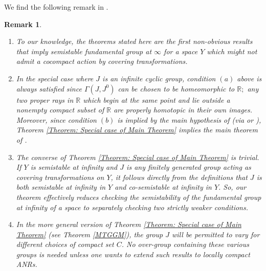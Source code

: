 \documentclass[12pt]{article}
\newtheorem{remark}[theorem]{Remark}
\begin{document}
We find the following remark in \cite{GGM1}.

\begin{remark} \label{Remark in Intro}
\hspace{.25in}
\begin{enumerate}

\item  To our knowledge, the theorems
stated here are the first non-obvious results that imply semistable
fundamental group at $\infty$ for a space $Y$ which might not admit a
cocompact action by covering transformations.

\item \label{Intro remark 2}In the special case where $J$ is an infinite
cyclic group, condition $(a)$ above is always satisfied since $\Gamma\left(
J,J^{0}\right)  $ can be chosen to be homeomorphic to $%
\mathbb{R};
$ any two proper rays in $%
\mathbb{R}
$ which begin at the same point and lie outside a nonempty compact subset of $%
\mathbb{R}
$ are properly homotopic in their own images. Moreover, since condition
$\left(  b\right)  $ is implied by the main hypothesis of \cite{GG12} (via
\cite[Lemma 3.1]{W92} or \cite[Th.16.3.4]{G}), Theorem
\ref{Theorem: Special case of Main Theorem} implies the main theorem of
\cite{GG12} .

\item The converse of Theorem \ref{Theorem: Special case of Main Theorem} is
trivial. If $Y$ is semistable at infinity and $J$ is any finitely generated
group acting as covering transformations on $Y$, it follows directly from the
definitions that $J$ is both semistable at infinity in $Y$ and co-semistable at
infinity in $Y$. So, our theorem effectively reduces checking the semistability
of the fundamental group at infinity of a space to separately checking two
strictly weaker conditions.

\item \label{Intro remark 4}In the more general version of Theorem
\ref{Theorem: Special case of Main Theorem} (see Theorem \ref{MTGGM}), the group $J$
will be permitted to vary for different choices of compact set $C$. No over-group containing these various groups is needed unless one wants to extend such results to locally compact ANRs. 
\end{enumerate}
\end{remark}
\end{document}
